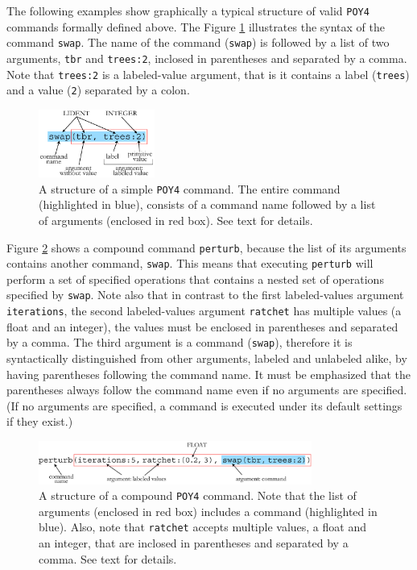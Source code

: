 \documentclass[11pt]{book}
\newcommand{\commandstyle}[1]{\texttt{#1}}
\newcommand{\poycommand}[1]{\commandstyle{#1}}
\newcommand{\poyargument}[1]{\commandstyle{#1}}
\newcommand{\poy}{\commandstyle{POY4}\xspace}
\begin{document}
The following examples show graphically a typical structure of valid \poy commands
formally defined above. The Figure \ref{simplecommand} illustrates
the syntax of the command \poycommand{swap}. The name of the
command (\poycommand{swap}) is followed by a list of two arguments,
\poyargument{tbr} and \poyargument{trees:2}, inclosed in parentheses
and separated by a comma. Note that \poyargument{trees:2} is a labeled-value
argument, that is it contains a label (\texttt{trees}) and a value (\texttt{2})
separated by a colon.

\begin{figure}[htbp]
   \centering
   \includegraphics[width=0.34\textwidth]{figures/fig-poycommand1.jpg}
   \caption{A structure of a simple \poy command. The entire command (highlighted
   in blue), consists of  a command name followed by a list of arguments (enclosed in red box).
   See text for details.}
   \label{simplecommand}
\end{figure}

Figure \ref{compositecommand} shows a compound command \poycommand{perturb}, because the list of its arguments contains another command, \poycommand{swap}. This means
that executing \poycommand{perturb} will perform a set of specified operations that contains
a nested set of operations specified by \poycommand{swap}. Note also that in contrast to the first labeled-values argument \poyargument{iterations}, the second labeled-values argument \poyargument{ratchet} has multiple values (a float and an integer), the values must be enclosed in parentheses and separated by a comma. The third argument is a command (\poycommand{swap}), therefore it is syntactically distinguished from other arguments, labeled and unlabeled alike, by having
parentheses following the command name. It must be emphasized that the parentheses always follow
the command name even if no arguments are specified. (If no arguments are specified, a command is executed under its default settings if they exist.)

\begin{figure}[htbp]
   \centering
   \includegraphics[width=0.8\textwidth]{figures/fig-poycommand2.jpg}
   \caption{A structure of a compound \poy command. Note that the list of arguments
   (enclosed in red box) includes a command (highlighted in blue). Also, note that
   \poyargument{ratchet} accepts multiple values, a float and an integer, that are inclosed in
   parentheses and separated by a comma. See text for details.}
   \label{compositecommand}
\end{figure}
\end{document}
